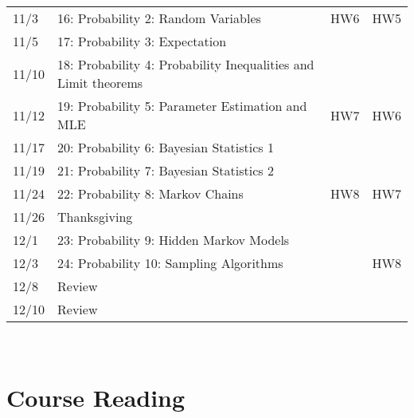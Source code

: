 \documentclass[11pt]{article}
\begin{document}
\begin{centering}
\begin{tabular}{||l|p{3in}|l|l||}
11/3 & 16: Probability 2: Random Variables  & HW6  & HW5  \\ 
11/5 & 17: Probability 3: Expectation &  &  \\ 
\hline

11/10 & 18: Probability 4: Probability Inequalities and Limit theorems&   & \\  
11/12& 19: Probability 5: Parameter Estimation and MLE   & HW7 & HW6   \\  
\hline
11/17 & 20: Probability 6: Bayesian Statistics 1 &   & \\  
11/19& 21: Probability 7: Bayesian Statistics 2 &  &   \\  
\hline
11/24 & 22: Probability 8: Markov Chains  & HW8  & HW7 \\
11/26 & Thanksgiving &   &  \\  
\hline

12/1 & 23: Probability 9: Hidden Markov Models &  &  \\
12/3 & 24: Probability 10: Sampling Algorithms &   & HW8 \\ 
\hline
12/8& Review &  &  \\
12/10& Review &  &  \\

\hline\hline

\end{tabular}\\
\end{centering}

\section*{Course Reading}
\end{document}
